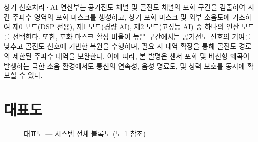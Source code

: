 \documentclass{article}
\begin{document}
상기 신호처리·AI 연산부는 공기전도 채널 및 골전도 채널의 포화 구간을 검출하여 시간-주파수 영역의 포화 마스크를 생성하고, 상기 포화 마스크 및 외부 소음도에 기초하여 제0 모드(DSP 전용), 제1 모드(경량 AI), 제2 모드(고성능 AI) 중 하나의 연산 모드를 선택한다. 또한, 포화 마스크 활성 비율이 높은 구간에서는 공기전도 신호의 기여를 낮추고 골전도 신호에 기반한 복원을 수행하며, 필요 시 대역 확장을 통해 골전도 경로의 제한된 주파수 대역을 보완한다. 이에 따라, 본 발명은 센서 포화 및 비선형 왜곡이 발생하는 극한 소음 환경에서도 통신의 연속성, 음성 명료도, 및 청력 보호를 동시에 확보할 수 있다.

\section{대표도}

\begin{figure}[H]
    \centering
    \resizebox{\textwidth}{!}{%
    }
    \caption*{대표도 — 시스템 전체 블록도 (도 1 참조)}
    \label{fig:representative}
\end{figure}
\end{document}
